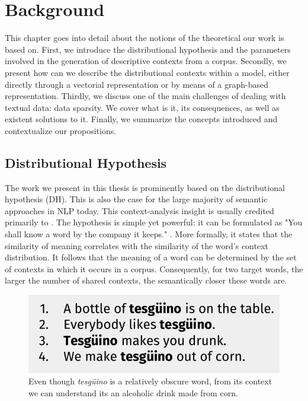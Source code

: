 \chapter{Background}
\label{chap:backgnd}
\begin{abstractchap}
This chapter goes into detail about the notions of the theoretical our work is based on. First, we introduce the distributional hypothesis and the parameters involved in the generation of descriptive contexts from a corpus. Secondly, we present how can we describe the distributional contexts within a model, either directly through a vectorial representation or by means of a graph-based representation. Thirdly, we discuss one of the main challenges of dealing with textual data: data sparsity. We cover what is it, its consequences, as well as existent solutions to it. Finally, we summarize the concepts introduced and contextualize our propositions.
\end{abstractchap}
\minitoc

\section{Distributional Hypothesis}\label{sec:disto_hyp}
The work we present in this thesis is prominently based on the distributional hypothesis (DH). This is also the case for the large majority of semantic approaches in NLP today. This context-analysis insight is usually credited primarily to \cite{harris1954}. The hypothesis is simple yet powerful: it can be formulated as "You shall know a word by the company it keeps." \cite{firth57synopsis}. More formally, it states that the similarity of meaning correlates with the similarity of the word's context distribution. It follows that the meaning of a word can be determined by the set of contexts in which it occurs in a corpus. Consequently, for two target words, the larger the number of shared contexts, the semantically closer these words are. 

\begin{figure}
\centering
\includegraphics[width=.6\linewidth]{images/Chapitre2/tejuino.pdf}
\caption{Even though \textit{tesg\"{u}ino} is a relatively obscure word, from its context we can understand its an alcoholic drink made from corn.}
\label{fig:tejuino}
\end{figure}


